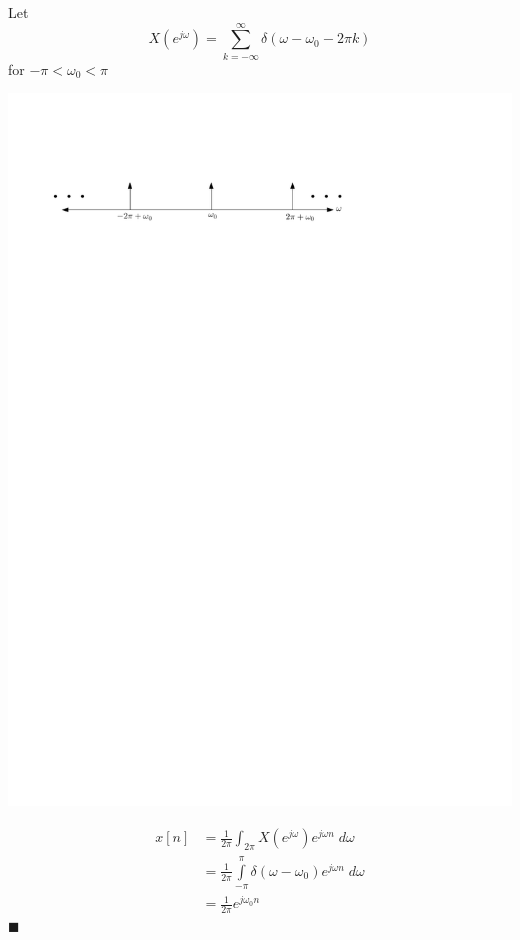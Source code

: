 \begin{example}
  Let 
  \[
  X\left(e^{j\omega}\right) = \sum\limits_{k = -\infty}^{\infty} \delta(\omega-\omega_0 -2\pi k) 
  \]
  for $-\pi < \omega_0 < \pi$

  \begin{center}
    \includegraphics[scale=1]{graphics/dtft-periodic-ex.pdf}
  \end{center}

  \begin{align*}
    x[n] &= \frac{1}{2\pi} \int_{2\pi} X\left(e^{j\omega}\right) e^{j\omega n} \; d\omega\\
    &= \frac{1}{2\pi} \int\limits_{-\pi}^{\pi} \delta(\omega-\omega_0)e^{j\omega n} \; d\omega\\
    &= \frac{1}{2\pi} e^{j\omega_0 n}
  \end{align*}
  $\blacksquare$
\end{example}


